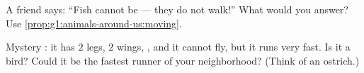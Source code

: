 \begin{exercise}[$\star\star$]\label{exo:g1:animals-around-us:9}
A friend says: ``Fish cannot be  --- they do not walk!''
What would you answer? Use \cref{prop:g1:animals-around-us:moving}.
\end{exercise}

\begin{exercise}[$\star\star$]\label{exo:g1:animals-around-us:10}
Mystery : it has $2$ legs, $2$ wings, , and it cannot
fly, but it runs very fast. Is it a bird? Could it be the fastest
runner of your neighborhood? (Think of an ostrich.)
\end{exercise}

